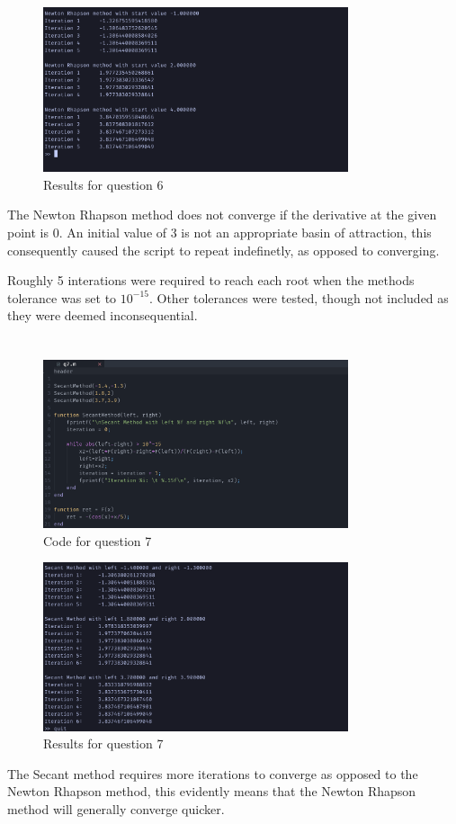 \documentclass{article}
\begin{document}
\begin{figure}[H]
	\centering
	\includegraphics[width=0.8\textwidth]{imgs/q6_results.png}
	\caption{Results for question 6}
	\label{fig:q6_result}
\end{figure}
The Newton Rhapson method does not converge if the derivative at the given point is 0. An initial value of 3 is not an appropriate basin of attraction, this consequently caused the script to repeat indefinetly, as opposed to converging. 

Roughly 5 interations were required to reach each root when the methods tolerance was set to $10^{-15}$. Other tolerances were tested, though not included as they were deemed inconsequential.
\newpage
\section{}
\begin{figure}[H]
	\centering
	\includegraphics[width=0.8\textwidth]{imgs/q7_code.png}
	\caption{Code for question 7}
	\label{fig:q7_code}
\end{figure}

\begin{figure}[H]
	\centering
	\includegraphics[width=0.8\textwidth]{imgs/q7_results.png}
	\caption{Results for question 7}
	\label{fig:q7_result}
\end{figure}
The Secant method requires more iterations to converge as opposed to the Newton Rhapson method, this evidently means that the Newton Rhapson method will generally converge quicker.
\end{document}
